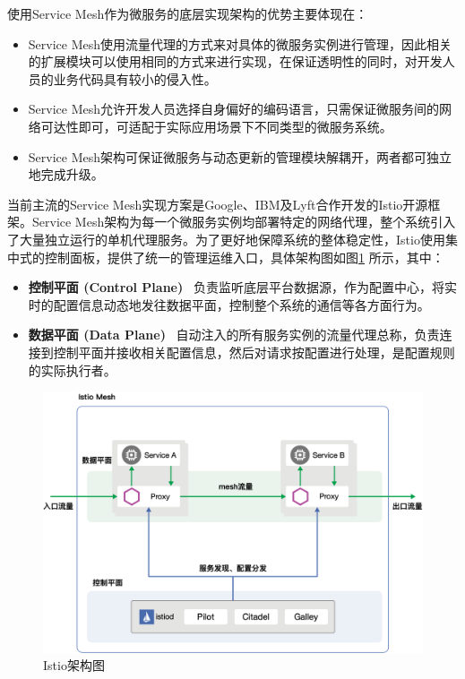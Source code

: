 \documentclass[macfonts,master]{njuthesis}
\begin{document}
使用Service Mesh作为微服务的底层实现架构的优势主要体现在：

\begin{itemize}
	\item Service Mesh使用流量代理的方式来对具体的微服务实例进行管理，因此相关的扩展模块可以使用相同的方式来进行实现，在保证透明性的同时，对开发人员的业务代码具有较小的侵入性。
	\item Service Mesh允许开发人员选择自身偏好的编码语言，只需保证微服务间的网络可达性即可，可适配于实际应用场景下不同类型的微服务系统。
	\item Service Mesh架构可保证微服务与动态更新的管理模块解耦开，两者都可独立地完成升级。
\end{itemize}

当前主流的Service Mesh实现方案是Google、IBM及Lyft合作开发的Istio开源框架\cite{sheikh2018modernize,wang2019developing}。Service Mesh架构为每一个微服务实例均部署特定的网络代理，整个系统引入了大量独立运行的单机代理服务。为了更好地保障系统的整体稳定性，Istio使用集中式的控制面板，提供了统一的管理运维入口，具体架构图如图\ref{fig:istio_arch} 所示，其中：

\begin{itemize}
	\item \textbf{控制平面 (Control Plane) }~负责监听底层平台数据源，作为配置中心，将实时的配置信息动态地发往数据平面，控制整个系统的通信等各方面行为。
	\item \textbf{数据平面 (Data Plane) }~自动注入的所有服务实例的流量代理总称，负责连接到控制平面并接收相关配置信息，然后对请求按配置进行处理，是配置规则的实际执行者。
\end{itemize}

\begin{figure}[!htbp]
  \centering
  \includegraphics[width= 1.0\textwidth]{image/istio_arch.png}
  \caption{Istio架构图}
  \label{fig:istio_arch}
\end{figure}
\end{document}
